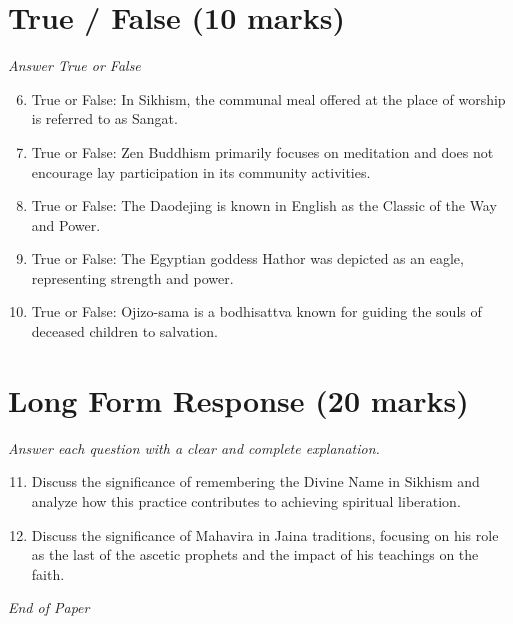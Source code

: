 \documentclass[12pt]{article}
\begin{document}
\section*{True / False (10 marks)}
\textit{Answer True or False}
\begin{enumerate}[label=\arabic*.]
\setcounter{enumi}{5}
\item True or False: In Sikhism, the communal meal offered at the place of worship is referred to as Sangat.
\item True or False: Zen Buddhism primarily focuses on meditation and does not encourage lay participation in its community activities.
\item True or False: The Daodejing is known in English as the Classic of the Way and Power.
\item True or False: The Egyptian goddess Hathor was depicted as an eagle, representing strength and power.
\item True or False: Ojizo-sama is a bodhisattva known for guiding the souls of deceased children to salvation.
\end{enumerate}

\section*{Long Form Response (20 marks)}
\textit{Answer each question with a clear and complete explanation.}
\begin{enumerate}[label=\arabic*.]
\setcounter{enumi}{10}
\item Discuss the significance of remembering the Divine Name in Sikhism and analyze how this practice contributes to achieving spiritual liberation.
\item Discuss the significance of Mahavira in Jaina traditions, focusing on his role as the last of the ascetic prophets and the impact of his teachings on the faith.
\end{enumerate}

\vfill
\noindent\textit{End of Paper}
\end{document}
